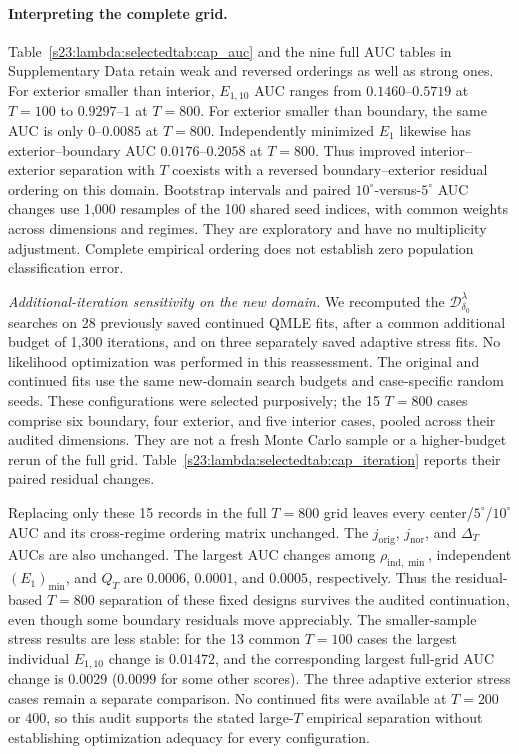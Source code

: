 \documentclass[12pt,letterpaper]{article}
\theoremstyle{plain}
\theoremstyle{definition}
\begin{document}
\paragraph{Interpreting the complete grid.}
Table~\ref{s23:lambda:selectedtab:cap_auc} and the nine full AUC
tables in Supplementary Data retain weak and reversed orderings
as well as strong ones.
For exterior smaller than interior, $E_{1,10}$ AUC ranges from
$0.1460$--$0.5719$ at $T=100$ to $0.9297$--$1$ at $T=800$.
For exterior smaller than boundary, the same AUC is only
$0$--$0.0085$ at $T=800$. Independently minimized $E_1$ likewise
has exterior--boundary AUC $0.0176$--$0.2058$ at $T=800$.
Thus improved interior--exterior separation with $T$ coexists with
a reversed boundary--exterior residual ordering on this domain.
Bootstrap intervals and paired $10^\circ$-versus-$5^\circ$ AUC
changes use 1,000 resamples of the 100 shared seed indices, with
common weights across dimensions and regimes. They are exploratory
and have no multiplicity adjustment. Complete empirical ordering
does not establish zero population classification error.

\par\medskip\noindent\textit{Additional-iteration sensitivity on the new domain.} We recomputed the $\mathcal D^\lambda_{\delta_0}$ searches on 28 previously saved continued QMLE fits, after a common additional budget of 1,300 iterations, and on three separately saved adaptive stress fits. No likelihood optimization was performed in this reassessment. The original and continued fits use the same new-domain search budgets and case-specific random seeds. These configurations were selected purposively; the 15 $T=800$ cases comprise six boundary, four exterior, and five interior cases, pooled across their audited dimensions. They are not a fresh Monte Carlo sample or a higher-budget rerun of the full grid. Table~\ref{s23:lambda:selectedtab:cap_iteration} reports their paired residual changes.

Replacing only these 15 records in the full $T=800$ grid leaves every center/$5^\circ$/$10^\circ$ AUC and its cross-regime ordering matrix unchanged. The $j_{\mathrm{orig}}$, $j_{\mathrm{nor}}$, and $\Delta_T$ AUCs are also unchanged. The largest AUC changes among $\rho_{\mathrm{ind},\min}$, independent $(E_1)_{\min}$, and $Q_T$ are $0.0006$, $0.0001$, and $0.0005$, respectively. Thus the residual-based $T=800$ separation of these fixed designs survives the audited continuation, even though some boundary residuals move appreciably. The smaller-sample stress results are less stable: for the 13 common $T=100$ cases the largest individual $E_{1,10}$ change is $0.01472$, and the corresponding largest full-grid AUC change is $0.0029$ ($0.0099$ for some other scores). The three adaptive exterior stress cases remain a separate comparison. No continued fits were available at $T=200$ or $400$, so this audit supports the stated large-$T$ empirical separation without establishing optimization adequacy for every configuration.
\end{document}
